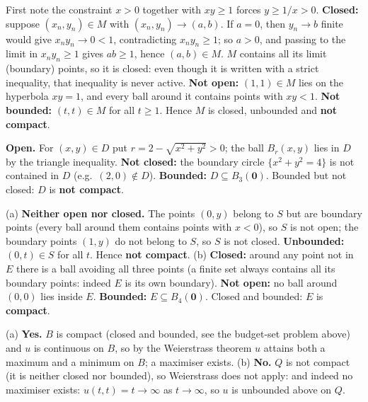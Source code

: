 \begin{solutions}
  \item First note the constraint $x>0$ together with $xy\ge1$ forces
        $y\ge1/x>0$. \textbf{Closed:} suppose
        $(x_n,y_n)\in M$ with $(x_n,y_n)\to(a,b)$. If $a=0$, then
        $y_n\to b$ finite would give $x_ny_n\to0<1$, contradicting
        $x_ny_n\ge1$; so $a>0$, and passing to the limit in
        $x_ny_n\ge1$ gives $ab\ge1$, hence $(a,b)\in M$. $M$ contains
        all its limit (boundary) points, so it is closed: even
        though it is written with a strict inequality, that inequality
        is never active. \textbf{Not open:} $(1,1)\in M$ lies on the
        hyperbola $xy=1$, and every ball around it contains points
        with $xy<1$. \textbf{Not bounded:} $(t,t)\in M$ for all
        $t\ge1$. Hence $M$ is closed, unbounded and \textbf{not
        compact}.

  \item \textbf{Open.} For $(x,y)\in D$ put
        $r=2-\sqrt{x^2+y^2}>0$; the ball $B_r(x,y)$ lies in $D$ by the
        triangle inequality. \textbf{Not closed:} the boundary circle
        $\{x^2+y^2=4\}$ is not contained in $D$ (e.g.\ $(2,0)\notin
        D$). \textbf{Bounded:} $D\subseteq B_3(\mathbf{0})$. Bounded
        but not closed: $D$ is \textbf{not compact}.

  \item (a) \textbf{Neither open nor closed.} The points $(0,y)$
        belong to $S$ but are boundary points (every ball around them
        contains points with $x<0$), so $S$ is not open; the boundary
        points $(1,y)$ do not belong to $S$, so $S$ is not closed.
        \textbf{Unbounded:} $(0,t)\in S$ for all $t$. Hence
        \textbf{not compact}. (b) \textbf{Closed:} around any point
        not in $E$ there is a ball avoiding all three points (a
        finite set always contains all its boundary points:
        indeed $E$ is its own boundary). \textbf{Not open:} no ball
        around $(0,0)$ lies inside $E$. \textbf{Bounded:}
        $E\subseteq B_4(\mathbf{0})$. Closed and bounded: $E$ is
        \textbf{compact}.

  \item (a) \textbf{Yes.} $B$ is compact (closed and bounded, see the
        budget-set problem above) and $u$ is continuous on $B$, so by
        the Weierstrass theorem $u$ attains both a maximum and a
        minimum on $B$; a maximiser exists. (b) \textbf{No.} $Q$ is
        not compact (it is neither closed nor bounded), so Weierstrass
        does not apply: and indeed no maximiser exists:
        $u(t,t)=t\to\infty$ as $t\to\infty$, so $u$ is unbounded above
        on $Q$.


\end{solutions}
